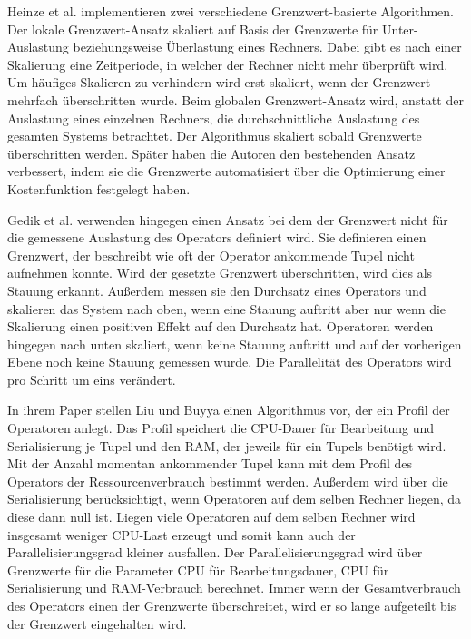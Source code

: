 Heinze et al. \cite{heinze_auto-scaling_2014} implementieren zwei verschiedene Grenzwert-basierte Algorithmen.
Der lokale Grenzwert-Ansatz skaliert auf Basis der Grenzwerte für Unter-Auslastung beziehungsweise Überlastung eines Rechners. 
Dabei gibt es nach einer Skalierung eine Zeitperiode, in welcher der Rechner nicht mehr überprüft wird.
Um häufiges Skalieren zu verhindern wird erst skaliert, wenn der Grenzwert mehrfach überschritten wurde.
Beim globalen Grenzwert-Ansatz wird, anstatt der Auslastung eines einzelnen Rechners, die durchschnittliche Auslastung des gesamten Systems betrachtet.
Der Algorithmus skaliert sobald Grenzwerte überschritten werden. 
Später haben die Autoren den bestehenden Ansatz verbessert, indem sie die Grenzwerte automatisiert über die Optimierung einer Kostenfunktion festgelegt haben\cite{heinze_online_2015}.

Gedik et al. \cite{gedik_elastic_2014} verwenden hingegen einen Ansatz bei dem der Grenzwert nicht für die gemessene Auslastung des Operators definiert wird.
Sie definieren einen Grenzwert, der beschreibt wie oft der Operator ankommende Tupel nicht aufnehmen konnte.
Wird der gesetzte Grenzwert überschritten, wird dies als Stauung erkannt.
Außerdem messen sie den Durchsatz eines Operators und skalieren das System nach oben, wenn eine Stauung auftritt aber nur wenn die Skalierung einen positiven Effekt auf den Durchsatz hat.
Operatoren werden hingegen nach unten skaliert, wenn keine Stauung auftritt und auf der vorherigen Ebene noch keine Stauung gemessen wurde.
Die Parallelität des Operators wird pro Schritt um eins verändert.

In ihrem Paper stellen Liu und Buyya \cite{liu_performance-oriented_2017} einen Algorithmus vor, der ein Profil der Operatoren anlegt. 
Das Profil speichert die CPU-Dauer für Bearbeitung und Serialisierung je Tupel und den RAM, der jeweils für ein Tupels benötigt wird.
Mit der Anzahl momentan ankommender Tupel kann mit dem Profil des Operators der Ressourcenverbrauch bestimmt werden.
Außerdem wird über die Serialisierung berücksichtigt, wenn Operatoren auf dem selben Rechner liegen, da diese dann null ist.
Liegen viele Operatoren auf dem selben Rechner wird insgesamt weniger CPU-Last erzeugt und somit kann auch der Parallelisierungsgrad kleiner ausfallen.
Der Parallelisierungsgrad wird über Grenzwerte für die Parameter CPU für Bearbeitungsdauer, CPU für Serialisierung und RAM-Verbrauch berechnet.
Immer wenn der Gesamtverbrauch des Operators einen der Grenzwerte überschreitet, wird er so lange aufgeteilt bis der Grenzwert eingehalten wird.

